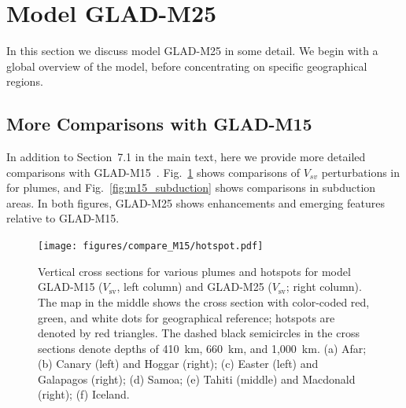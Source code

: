 \documentclass[extra,mreferee]{gji}
\begin{document}
\section{Model GLAD-M25}
\label{section:model}

In this section we discuss model GLAD-M25 in some detail.
We begin with a global overview of the model, before concentrating on
specific geographical regions.

\subsection{More Comparisons with GLAD-M15}

In addition to Section~7.1 in the main text, here we provide more detailed comparisons with GLAD-M15~\citep{bozdaug2016global}. Fig.~\ref{fig:m15_hotspot} shows comparisons of $V_{sv}$ perturbations in for plumes, and Fig.~\ref{fig:m15_subduction} shows comparisons in subduction areas. In both figures, GLAD-M25 shows enhancements and emerging features relative to GLAD-M15.

\begin{figure}
  \centering
  \texttt{[image: figures/compare\_M15/hotspot.pdf]}
  \caption{\small{Vertical cross sections for various plumes and hotspots for model GLAD-M15 ($V_\textrm{sv}$, left column) and GLAD-M25 ($V_\textrm{sv}$; right column).
  The map in the middle shows the cross section with color-coded red, green, and white dots for geographical reference; hotspots are denoted by red triangles.
  The dashed black semicircles in the cross sections denote depths of 410~km, 660~km, and 1,000~km.
  (a) Afar; (b) Canary (left) and Hoggar (right); (c) Easter (left) and Galapagos (right); (d) Samoa; (e) Tahiti (middle) and Macdonald (right); (f) Iceland.
  }}
  \label{fig:m15_hotspot}
\end{figure}
\end{document}
